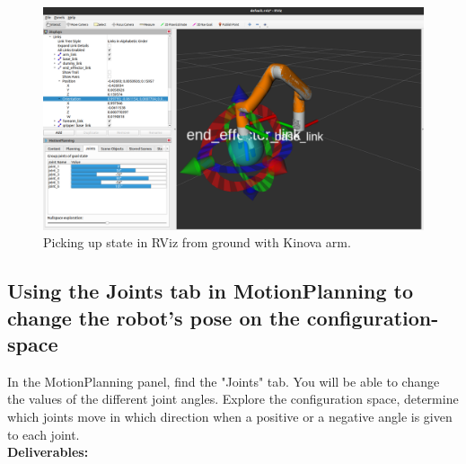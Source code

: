 \documentclass[12pt]{article}
\begin{document}
\begin{enumerate}
\begin{enumerate}
            \begin{figure}[H]
                \centering\includegraphics[width=15cm]{images/kinova_pickup.png}
                \caption{Picking up state in RViz from ground with Kinova arm.}\label{fig:kinova_pickup}
            \end{figure}

        \end{enumerate}

\end{enumerate}

\subsection{Using the Joints tab in MotionPlanning to change the robot’s pose on the configuration-space}

In the MotionPlanning panel, find the "Joints" tab. You will be able to change the values of the different joint angles. Explore the configuration space, determine which joints move in which direction when a positive or a negative angle is given to each joint.
\\

\textbf{Deliverables:}
\end{document}
